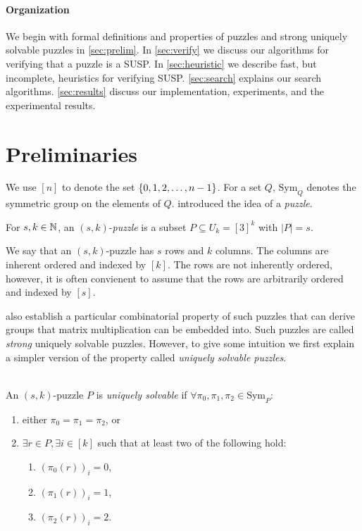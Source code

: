 \documentclass[11pt]{article}
\newcommand\sse{\subseteq}
\newcommand\Sym[1]{\ensuremath{\mathrm{Sym}_{#1}}}
\begin{document}
\paragraph{Organization}
We begin with formal definitions and properties of puzzles and strong
uniquely solvable puzzles in \autoref{sec:prelim}.  In
\autoref{sec:verify} we discuss our algorithms for verifying that a
puzzle is a SUSP.  In \autoref{sec:heuristic} we describe fast,
but incomplete, heuristics for verifying SUSP.
\autoref{sec:search} explains our search algorithms.
\autoref{sec:results} discuss our implementation, experiments, and
the experimental results.


\section{Preliminaries}
\label{sec:prelim}

\newcommand\ordset[1]{\ensuremath{[#1]}}

We use $\ordset{n}$ to denote the set $\left\{ 0,1,2,\ldots, n-1 \right\}$.  For
a set $Q$, $\Sym{Q}$ denotes the symmetric group on the elements of
$Q$.  \cite{cksu05} introduced the idea of a \emph{puzzle}.

\begin{definition}[Puzzle]
  For $s, k \in \mathbb{N}$, an $(s,k)$-\emph{puzzle} is a
  subset $P \sse U_k = \ordset{3}^k$ with $|P| = s$.
\end{definition}

We say that an $(s,k)$-puzzle has $s$ rows and $k$ columns.  The
columns are inherent ordered and indexed by $\ordset{k}$.  The rows are not
inherently ordered, however, it is often convienent to assume that the
rows are arbitrarily ordered and indexed by $\ordset{s}$.

\cite{cksu05} also establish a particular combinatorial property of
such puzzles that can derive groups that matrix multiplication can be
embedded into.  Such puzzles are called \emph{strong} uniquely
solvable puzzles.  However, to give some intuition we first explain a
simpler version of the property called \emph{uniquely solvable
  puzzles}.

\begin{definition}
  ~\\An $(s,k)$-puzzle $P$ is \emph{uniquely solvable} if
  $\forall \pi_0, \pi_1, \pi_2 \in \Sym{P}:$
  \begin{enumerate}
  \item either $\pi_0 = \pi_1 = \pi_2$, or
  \item $\exists r \in P, \exists i \in \ordset{k}$ such that at least two
    of the following hold:
    \begin{enumerate}
    \item $(\pi_0(r))_i = 0$,
    \item $(\pi_1(r))_i = 1$,
    \item $(\pi_2(r))_i = 2$.
    \end{enumerate}
  \end{enumerate}
\end{definition}
\end{document}
